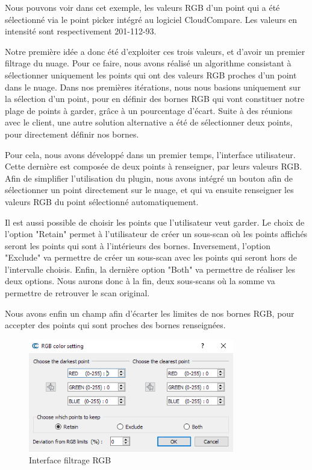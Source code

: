 \documentclass[12pt,titlepage,french]{article}
\begin{document}
Nous pouvons voir dans cet exemple, les valeurs RGB d'un point qui a été sélectionné via le point picker intégré au logiciel CloudCompare. Les valeurs en intensité sont respectivement 201-112-93. \newline

Notre première idée a donc été d'exploiter ces trois valeurs, et d'avoir un premier filtrage du nuage. Pour ce faire, nous avons réalisé un algorithme consistant à sélectionner uniquement les points qui ont des valeurs RGB proches d'un point dans le nuage. Dans nos premières itérations, nous nous basions uniquement sur la sélection d'un point, pour en définir des bornes RGB qui vont constituer notre plage de points à garder, grâce à un pourcentage d'écart. Suite à des réunions avec le client, une autre solution alternative a été de sélectionner deux points, pour directement définir nos bornes. \newline

Pour cela, nous avons développé dans un premier temps, l'interface utilisateur. Cette dernière est composée de deux points à renseigner, par leurs valeurs RGB. Afin de simplifier l'utilisation du plugin, nous avons intégré un bouton afin de sélectionner un point directement sur le nuage, et qui va ensuite renseigner les valeurs RGB du point sélectionné automatiquement. \newline

Il est aussi possible de choisir les points que l'utilisateur veut garder. Le choix de l'option "Retain" permet à l'utilisateur de créer un sous-scan où les points affichés seront les points qui sont à l'intérieurs des bornes. Inversement, l'option "Exclude" va permettre de créer un sous-scan avec les points qui seront hors de l'intervalle choisis. Enfin, la dernière option "Both" va permettre de réaliser les deux options. Nous aurons donc à la fin, deux sous-scans où la somme va permettre de retrouver le scan original.

Nous avons enfin un champ afin d'écarter les limites de nos bornes RGB, pour accepter des points qui sont proches des bornes renseignées.  \newline

\begin{figure}[H]
\center \includegraphics[width=0.8\textwidth]{./img/ui_filter_rgb.png}
  \caption{\label{} Interface filtrage RGB}
\end{figure}
\end{document}
